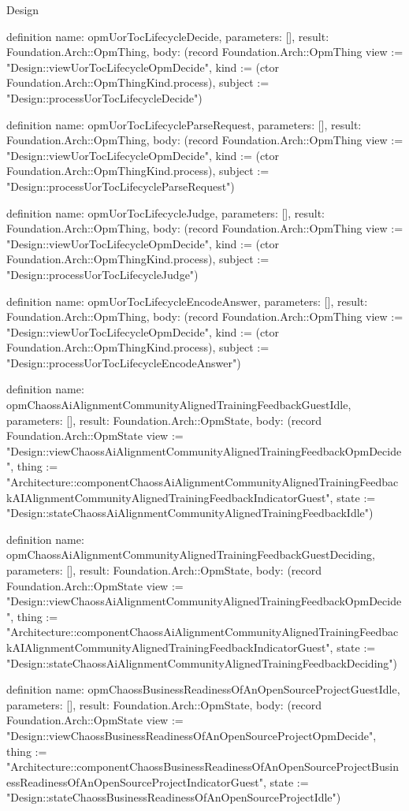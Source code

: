 \begin{lexlean}{Design}
\begin{semanticmodule}
definition{
  name: opmUorTocLifecycleDecide,
  parameters: [],
  result: Foundation.Arch::OpmThing,
  body: (record Foundation.Arch::OpmThing {view := "Design::viewUorTocLifecycleOpmDecide", kind := (ctor Foundation.Arch::OpmThingKind.process), subject := "Design::processUorTocLifecycleDecide"})
}

definition{
  name: opmUorTocLifecycleParseRequest,
  parameters: [],
  result: Foundation.Arch::OpmThing,
  body: (record Foundation.Arch::OpmThing {view := "Design::viewUorTocLifecycleOpmDecide", kind := (ctor Foundation.Arch::OpmThingKind.process), subject := "Design::processUorTocLifecycleParseRequest"})
}

definition{
  name: opmUorTocLifecycleJudge,
  parameters: [],
  result: Foundation.Arch::OpmThing,
  body: (record Foundation.Arch::OpmThing {view := "Design::viewUorTocLifecycleOpmDecide", kind := (ctor Foundation.Arch::OpmThingKind.process), subject := "Design::processUorTocLifecycleJudge"})
}

definition{
  name: opmUorTocLifecycleEncodeAnswer,
  parameters: [],
  result: Foundation.Arch::OpmThing,
  body: (record Foundation.Arch::OpmThing {view := "Design::viewUorTocLifecycleOpmDecide", kind := (ctor Foundation.Arch::OpmThingKind.process), subject := "Design::processUorTocLifecycleEncodeAnswer"})
}

definition{
  name: opmChaossAiAlignmentCommunityAlignedTrainingFeedbackGuestIdle,
  parameters: [],
  result: Foundation.Arch::OpmState,
  body: (record Foundation.Arch::OpmState {view := "Design::viewChaossAiAlignmentCommunityAlignedTrainingFeedbackOpmDecide", thing := "Architecture::componentChaossAiAlignmentCommunityAlignedTrainingFeedbackAIAlignmentCommunityAlignedTrainingFeedbackIndicatorGuest", state := "Design::stateChaossAiAlignmentCommunityAlignedTrainingFeedbackIdle"})
}

definition{
  name: opmChaossAiAlignmentCommunityAlignedTrainingFeedbackGuestDeciding,
  parameters: [],
  result: Foundation.Arch::OpmState,
  body: (record Foundation.Arch::OpmState {view := "Design::viewChaossAiAlignmentCommunityAlignedTrainingFeedbackOpmDecide", thing := "Architecture::componentChaossAiAlignmentCommunityAlignedTrainingFeedbackAIAlignmentCommunityAlignedTrainingFeedbackIndicatorGuest", state := "Design::stateChaossAiAlignmentCommunityAlignedTrainingFeedbackDeciding"})
}

definition{
  name: opmChaossBusinessReadinessOfAnOpenSourceProjectGuestIdle,
  parameters: [],
  result: Foundation.Arch::OpmState,
  body: (record Foundation.Arch::OpmState {view := "Design::viewChaossBusinessReadinessOfAnOpenSourceProjectOpmDecide", thing := "Architecture::componentChaossBusinessReadinessOfAnOpenSourceProjectBusinessReadinessOfAnOpenSourceProjectIndicatorGuest", state := "Design::stateChaossBusinessReadinessOfAnOpenSourceProjectIdle"})
}


\end{semanticmodule}
\end{lexlean}
